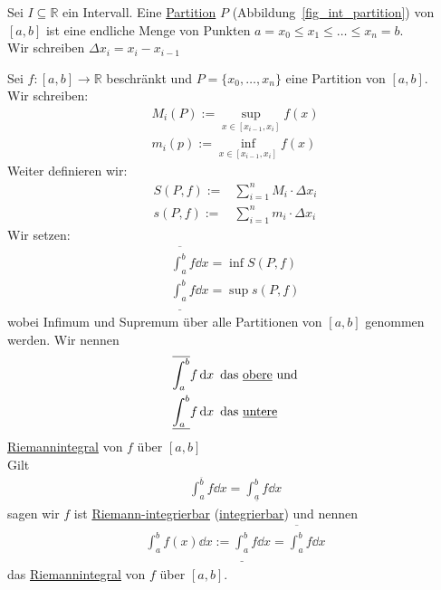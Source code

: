 \begin{Definition}{
	Sei $ I \subseteq \mathbb{R}$ ein Intervall. Eine \underline{Partition} $P$ 
	(Abbildung~\ref{fig_int_partition}) von 
	$[a,b]$ ist eine endliche Menge von Punkten $a = x_0 \leq x_1 \leq \hdots
	\leq x_n = b$.\\
	Wir schreiben $\Delta x_i = x_i - x_{i-1}$
	
}\end{Definition}

\begin{Definition}{ \label{def_riemann-integrierbar}
	Sei $f : [a,b] \rightarrow \mathbb{R}$ beschränkt und $P = \{x_0, \hdots, x_n\}$ 
	eine Partition von $[a,b]$.\\
	Wir schreiben: 
	\begin{align*}
		M_i(P) := \sup_{x \in [x_{i-1}, x_i]} f(x) \\
		m_i(p) := \inf_{x \in [x_{i-1}, x_i]} f(x)
	\end{align*}
	Weiter definieren wir: 
	\begin{align*}
		S(P,f) := & \sum_{i=1}^n M_i \cdot \Delta x_i \\
		s(P,f) := & \sum_{i=1}^n m_i \cdot \Delta x_i
	\end{align*}
	Wir setzen:
	\begin{align*}
		\overline{\int_a^b} f \dd{x} = \inf S(P,f) \\
		\underline{\int_a^b} f \dd{x} = \sup s(P,f)
	\end{align*}
	wobei Infimum und Supremum über alle Partitionen von $[a,b]$ genommen werden. 
	Wir nennen 
	\begin{align*}
		& \overline{\int_a^b} f \dd{x} \text{ das \underline{obere} und} \\
		& \underline{\int_a^b} f \dd{x} \text{ das \underline{untere}}
	\end{align*}
	\underline{Riemannintegral} von $f$ über $[a,b]$ \\
	Gilt 
	\begin{align*}
		\int_a^{\overline{b}} f \dd{x} = \int_{\underline{a}}^b f \dd{x}
	\end{align*}
	sagen wir $f$ ist \underline{Riemann-integrierbar} (\underline{integrierbar}) 
	und nennen 
	\begin{align*}
		\int_a^b f(x) \dd{x} := \underline{\int_a^b} f \dd{x} = 
		\overline{\int_a^b} f \dd{x}
	\end{align*}
	das \underline{Riemannintegral} von $f$ über $[a,b]$.\\
}
\end{Definition}

